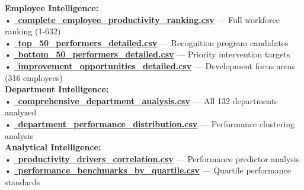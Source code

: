 \documentclass[12pt,a4paper]{article}
\begin{document}
\begin{resourcebox}
\textbf{Employee Intelligence:}\\
• \textcolor{primaryGold}{\href{https://fixysaskihumorizijuv.supabase.co/storage/v1/object/public/research-files/10c10921-f037-476a-a3e2-443b4f24dacd-complete_employee_productivity_ranking.csv?download=}{{\normalsize\faTrophy}\, \textbf{complete\_employee\_productivity\_ranking.csv}}} — Full workforce ranking (1-632)\\
• \textcolor{accentGold}{\href{https://fixysaskihumorizijuv.supabase.co/storage/v1/object/public/research-files/d7107b00-7e41-4006-a14b-1bd782f73914-top_50_performers_detailed.csv?download=}{{\normalsize\faMedal}\, \textbf{top\_50\_performers\_detailed.csv}}} — Recognition program candidates\\
• \textcolor{dangerRed}{\href{https://fixysaskihumorizijuv.supabase.co/storage/v1/object/public/research-files/82454a51-b4a9-4f64-b213-29ce048aad16-bottom_50_performers_detailed.csv?download=}{{\normalsize\faWarning}\, \textbf{bottom\_50\_performers\_detailed.csv}}} — Priority intervention targets\\
• \textcolor{successGreen}{\href{https://fixysaskihumorizijuv.supabase.co/storage/v1/object/public/research-files/03f82764-e85b-4f1f-b127-04cb7347bd2b-improvement_opportunities_detailed.csv?download=}{{\normalsize\faCheckCircle}\, \textbf{improvement\_opportunities\_detailed.csv}}} — Development focus areas (316 employees)\\[0.5em]

\textbf{Department Intelligence:}\\
• \textcolor{primaryBlue}{\href{https://fixysaskihumorizijuv.supabase.co/storage/v1/object/public/research-files/c063886e-6e70-476c-b87d-de0dc3c0f2b9-comprehensive_department_analysis.csv?download=}{{\normalsize\faBuilding}\, \textbf{comprehensive\_department\_analysis.csv}}} — All 132 departments analyzed\\
• \textcolor{primaryBlue}{\href{https://fixysaskihumorizijuv.supabase.co/storage/v1/object/public/research-files/61dcab8f-47f2-46f1-855f-7e95c4447bf0-department_performance_distribution.csv?download=}{{\normalsize\faSitemap}\, \textbf{department\_performance\_distribution.csv}}} — Performance clustering analysis\\[0.5em]

\textbf{Analytical Intelligence:}\\
• \textcolor{successGreen}{\href{https://fixysaskihumorizijuv.supabase.co/storage/v1/object/public/research-files/dd2c8aa8-1c3d-4592-8ce2-9e275d102803-productivity_drivers_correlation.csv?download=}{{\normalsize\faCogs}\, \textbf{productivity\_drivers\_correlation.csv}}} — Performance predictor analysis\\
• \textcolor{primaryGold}{\href{https://fixysaskihumorizijuv.supabase.co/storage/v1/object/public/research-files/e3bd4059-8cc7-437f-8aab-a2ed0700120e-performance_benchmarks_by_quartile.csv?download=}{{\normalsize\faChartArea}\, \textbf{performance\_benchmarks\_by\_quartile.csv}}} — Quartile performance standards\\[0.5em]


\end{resourcebox}
\end{document}
